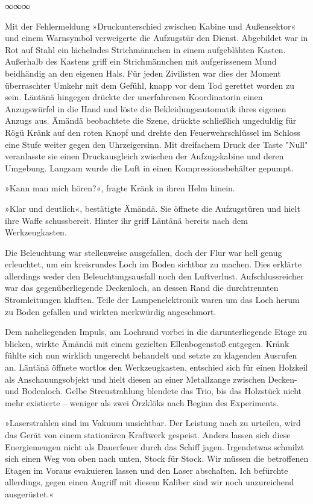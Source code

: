 \begin{center}
	∞∞∞
\end{center}

Mit der Fehlermeldung »Druckunterschied zwischen Kabine und Außensektor« und einem Warnsymbol verweigerte die Aufzugstür den Dienst. Abgebildet war in Rot auf Stahl ein lächelndes Strichmännchen in einem aufgeblähten Kasten. Außerhalb des Kastens griff ein Strichmännchen mit aufgerissenem Mund beidhändig an den eigenen Hals. Für jeden Zivilisten war dies der Moment überraschter Umkehr mit dem Gefühl, knapp vor dem Tod gerettet worden zu sein. Läntänä hingegen drückte der unerfahrenen Koordinatorin einen Anzugswürfel in die Hand und löste die Bekleidungsautomatik ihres eigenen Anzugs aus. Ämändä beobachtete die Szene, drückte schließlich ungeduldig für Rögü Kränk auf den roten Knopf und drehte den Feuerwehrschlüssel im Schloss eine Stufe weiter gegen den Uhrzeigersinn. Mit dreifachem Druck der Taste "Null" veranlasste sie einen Druckausgleich zwischen der Aufzugskabine und deren Umgebung. Langsam wurde die Luft in einen Kompressionsbehälter gepumpt.

»Kann man mich hören?«, fragte Kränk in ihren Helm hinein.

»Klar und deutlich«, bestätigte Ämändä. Sie öffnete die Aufzugstüren und hielt ihre Waffe schussbereit. Hinter ihr griff Läntänä bereits nach dem Werkzeugkasten.

Die Beleuchtung war stellenweise ausgefallen, doch der Flur war hell genug erleuchtet, um ein kreisrundes Loch im Boden sichtbar zu machen. Dies erklärte allerdings weder den Beleuchtungsausfall noch den Luftverlust. Aufschlussreicher war das gegenüberliegende Deckenloch, an dessen Rand die durchtrennten Stromleitungen klafften. Teile der Lampenelektronik waren um das Loch herum zu Boden gefallen und wirkten merkwürdig angeschmort.

Dem naheliegenden Impuls, am Lochrand vorbei in die darunterliegende Etage zu blicken, wirkte Ämändä mit einem gezielten Ellenbogenstoß entgegen. Kränk fühlte sich nun wirklich ungerecht behandelt und setzte zu klagenden Ausrufen an. Läntänä öffnete wortlos den Werkzeugkasten, entschied sich für einen Holzkeil als Anschauungsobjekt und hielt diesen an einer Metallzange zwischen Decken- und Bodenloch. Gelbe Streustrahlung blendete das Trio, bis das Holzstück nicht mehr existierte – weniger als zwei Örzklöks nach Beginn des Experiments.

»Laserstrahlen sind im Vakuum unsichtbar. Der Leistung nach zu urteilen, wird das Gerät von einem stationären Kraftwerk gespeist. Anders lassen sich diese Energiemengen nicht als Dauerfeuer durch das Schiff jagen. Irgendetwas schmilzt sich einen Weg von oben nach unten, Stock für Stock. Wir müssen die betroffenen Etagen im Voraus evakuieren lassen und den Laser abschalten. Ich befürchte allerdings, gegen einen Angriff mit diesem Kaliber sind wir noch unzureichend ausgerüstet.«

